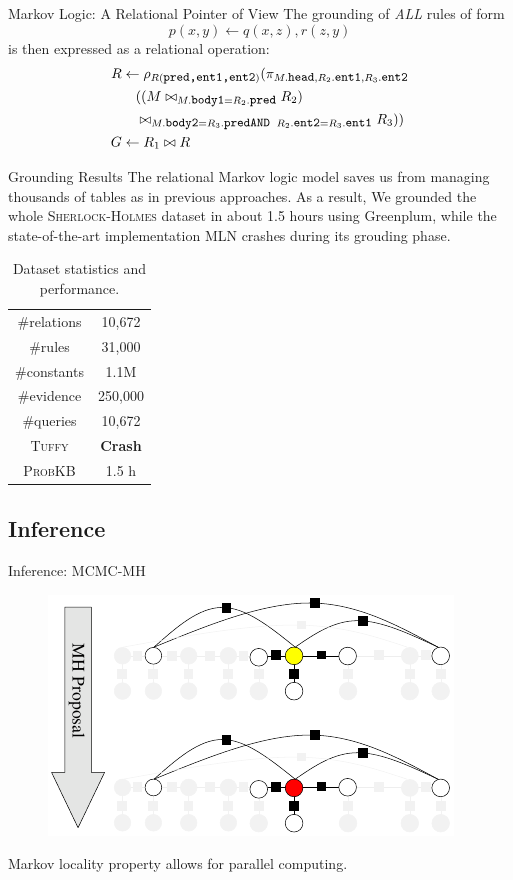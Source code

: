 \documentclass[onlymath,xcolor=pdftex,dvipsnames,table]{beamer}
\newcommand{\probkb}{\textsc{ProbKB}\xspace}
\newcommand{\sherlock}{\textsc{Sherlock}\xspace}
\newcommand{\holmes}{\textsc{Holmes}\xspace}
\newcommand{\tuffy}{\textsc{Tuffy}\xspace}
\let\oldemph\emph
\renewcommand{\emph}[1]{{\color{Blue}\oldemph{#1}}}
\newcommand{\stt}[1]{\texttt{\small #1}\xspace}
\begin{document}
\begin{frame}{Markov Logic: A Relational Pointer of View}
The grounding of \emph{ALL} rules of form $$p(x,y)\leftarrow q(x,z), r(z,y)$$ is then expressed as a relational operation:
\begin{align}\small
R&\leftarrow\rho_{R(\stt{pred,ent1,ent2})}(\pi_{M.\stt{head}, R_2.\stt{ent1}, R_3.\stt{ent2}}\\\nonumber
&\phantom{\leftarrow}((M\bowtie_{M.\stt{body1}=R_2.\stt{pred}} R_2)\\\nonumber
&\phantom{\leftarrow}\bowtie_{M.\stt{body2}=R_3.\stt{pred} \stt{ AND } R_2.\stt{ent2}=R_3.\stt{ent1}} R_3))\nonumber\\
G&\leftarrow R_1\bowtie R\nonumber
\end{align}
\end{frame}


\begin{frame}{Grounding Results}
The relational Markov logic model saves us from managing thousands of tables as in previous approaches. As a result, We grounded the whole \sherlock-\holmes dataset in about 1.5 hours using Greenplum, while the state-of-the-art implementation MLN crashes during its grouding phase.
\begin{table}
  \centering
  \begin{tabular}{|c|c|}\hline
   \#relations & 10,672 \\
   \#rules     & 31,000 \\
   \#constants & 1.1M \\
   \#evidence  & 250,000 \\
   \#queries   & 10,672 \\
   \tuffy      & \textbf{\color{Red}Crash} \\
   \probkb     & 1.5 h\\
   \hline
  \end{tabular}
  \caption{Dataset statistics and performance.}
\end{table}
\end{frame}


\subsection{Inference}
\begin{frame}{Inference: MCMC-MH}
\begin{figure}
  \centering
  \includegraphics[width=.5\textwidth]{mcmc.pdf}
\end{figure}
Markov locality property allows for parallel computing.
\end{frame}
\end{document}
